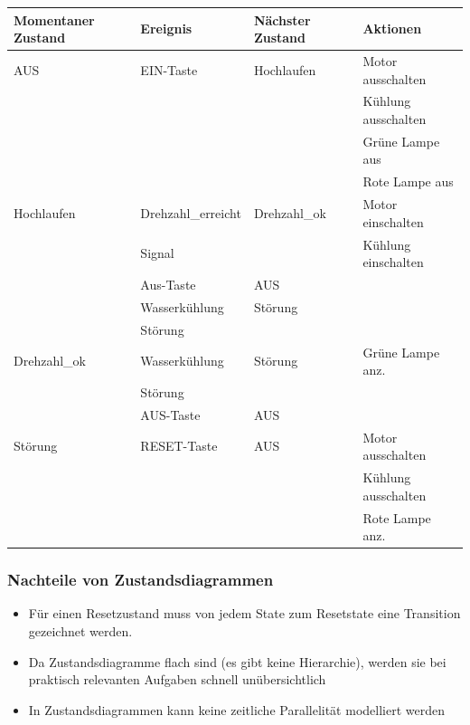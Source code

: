 \begin{tabular}{|l|l|l|l|}
\hline
\textbf{Momentaner Zustand}&\textbf{Ereignis}&\textbf{Nächster
Zustand}&\textbf{Aktionen}\\
\hline
AUS&EIN-Taste&Hochlaufen&Motor ausschalten\\
&&&Kühlung ausschalten\\&&&Grüne Lampe aus\\&&&Rote Lampe aus\\
\hline
Hochlaufen&Drehzahl\_erreicht&Drehzahl\_ok&Motor einschalten\\
&Signal&&Kühlung einschalten\\ \cline{2-3}
&Aus-Taste&AUS&\\\cline{2-3}
&Wasserkühlung&Störung&\\
&Störung&&\\
\hline
Drehzahl\_ok&Wasserkühlung&Störung&Grüne Lampe anz.\\
&Störung&&\\ \cline{2-3}
&AUS-Taste&AUS&\\
\hline
Störung&RESET-Taste&AUS&Motor ausschalten\\
&&&Kühlung ausschalten\\&&&Rote Lampe anz.\\
\hline
\end{tabular}

\subsubsection{Nachteile von Zustandsdiagrammen}
\begin{itemize}
  \item Für einen Resetzustand muss von jedem State zum Resetstate eine Transition gezeichnet werden.
  \item Da Zustandsdiagramme flach sind (es gibt keine Hierarchie), werden sie bei
        praktisch relevanten Aufgaben schnell unübersichtlich
  \item In Zustandsdiagrammen kann keine zeitliche Parallelität modelliert werden
\end{itemize}


